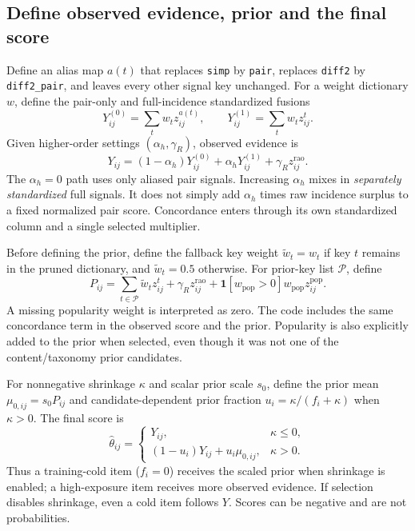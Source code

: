 \documentclass[11pt,a4paper]{article}
\newcommand{\code}[1]{\nolinkurl{#1}}
\newcommand{\sig}[1]{\mathrm{#1}}
\numberwithin{equation}{section}
\begin{document}
\subsection{Define observed evidence, prior and the final score}
Define an alias map $a(t)$ that replaces \code{simp} by \code{pair}, replaces
\code{diff2} by \code{diff2_pair}, and leaves every other signal key unchanged. For a
weight dictionary $w$, define the pair-only and full-incidence standardized fusions
\begin{equation}
 Y^{(0)}_{ij}=\sum_t w_t z^{a(t)}_{ij},\qquad
 Y^{(1)}_{ij}=\sum_t w_t z^t_{ij}.
\end{equation}
Given higher-order settings $(\alpha_h,\gamma_R)$, observed evidence is
\begin{equation}\label{eq:Y}
 Y_{ij}=(1-\alpha_h)Y^{(0)}_{ij}+\alpha_hY^{(1)}_{ij}
                         +\gamma_R z^{\sig{rao}}_{ij}.
\end{equation}
The $\alpha_h=0$ path uses only aliased pair signals. Increasing $\alpha_h$ mixes in
\emph{separately standardized} full signals. It does not simply add $\alpha_h$ times
raw incidence surplus to a fixed normalized pair score. Concordance enters through its
own standardized column and a single selected multiplier.

Before defining the prior, define the fallback key weight
$\widetilde w_t=w_t$ if key $t$ remains in the pruned dictionary, and
$\widetilde w_t=0.5$ otherwise. For prior-key list $\mathcal P$, define
\begin{equation}\label{eq:prior}
 P_{ij}=\sum_{t\in\mathcal P}\widetilde w_t z^t_{ij}
        +\gamma_R z^{\sig{rao}}_{ij}
        +\mathbf1[w_{\sig{pop}}>0]w_{\sig{pop}}z^{\sig{pop}}_{ij}.
\end{equation}
A missing popularity weight is interpreted as zero. The code includes the same concordance
term in the observed score and the prior. Popularity is also explicitly added to the prior
when selected, even though it was not one of the content/taxonomy prior candidates.

For nonnegative shrinkage $\kappa$ and scalar prior scale $s_0$, define the prior mean
$\mu_{0,ij}=s_0P_{ij}$ and candidate-dependent prior fraction
$u_i=\kappa/(f_i+\kappa)$ when $\kappa>0$. The final score is
\begin{equation}\label{eq:posterior}
 \widehat\theta_{ij}=\begin{cases}
 Y_{ij},&\kappa\le0,\\
 (1-u_i)Y_{ij}+u_i\mu_{0,ij},&\kappa>0.
 \end{cases}
\end{equation}
Thus a training-cold item ($f_i=0$) receives the scaled prior when shrinkage is enabled;
a high-exposure item receives more observed evidence. If selection disables shrinkage,
even a cold item follows $Y$. Scores can be negative and are not probabilities.
\end{document}
